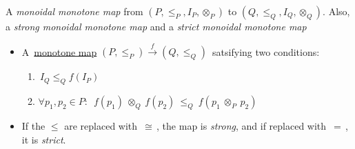 A \emph{monoidal monotone map} from $(P,\leq_P,I_P,\otimes_P)$ to $(Q, \leq_Q,I_Q,\otimes_Q)$. Also, a \emph{strong monoidal monotone map} and a \emph{strict monoidal monotone map}

\begin{itemize}
    \item A \,\hyperref[D1.59]{monotone map} $(P,\leq_P) \xrightarrow{f} (Q,\leq_Q)$\, satsifying two conditions:
          \begin{enumerate}
            \item \,$I_Q \leq_Q f(I_P)$\,
            \item $\forall p_1,p_2 \in P:$ \,$f(p_1)\ \otimes_Q\ f(p_2)\ \leq_Q\ f(p_1\ \otimes_P\ p_2)$\,
          \end{enumerate}
    \item If the $\leq$ are replaced with \,$\cong$\,, the map is \emph{strong}, and if replaced with \,$=$\,, it is \emph{strict}.
  \end{itemize}

